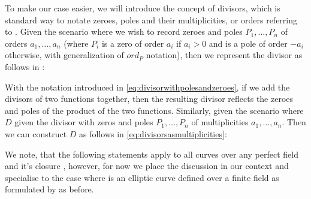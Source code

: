 To make our case easier, we will introduce the concept of divisors, which is standard way to notate zeroes, poles and their multiplicities, or orders referring to \cite{lynn2007implementation}.  Given the scenario where we wish to record zeroes and poles $P_1, \ldots, P_n$ of orders $a_1, \ldots, a_n$ (where $P_i$ is a zero of
order $a_i$ if $a_i > 0$ and is a pole of order $-a_i$ otherwise, with generalization of $ord_P$ notation), then we represent the divisor as follows in : 



With the notation introduced in \ref{eq:divisorwithpolesandzeroes},  if we add the divisors of two functions together, then the resulting divisor reflects the zeroes and poles of the product of the two functions.  Similarly, given the scenario where $D$ given the divisor with zeros and poles $P_1, \ldots, P_n$ of multiplicities $a_1, \ldots, a_n$. Then we can construct $D$ as follows in \ref{eq:divisorsasmultiplicities}:




We note, that the following statements apply to all curves  over any perfect field \mathFormulaFieldArbitrary and it's closure \mathFormulaFieldArbitraryClosure, however,
for now we place the discussion in our context and specialise to the case where  is an elliptic curve  defined over a finite field as formulated by \mathFormulaTwoSidesEqual{\mathFormulaFieldArbitrary}{\FieldFq} as before. 



